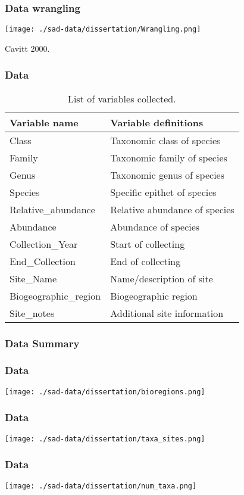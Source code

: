 \documentclass[14pt]{beamer}
\begin{document}
\begin{frame}[t]
\frametitle{Data wrangling}
\begin{center}
\texttt{[image: ./sad-data/dissertation/Wrangling.png]}
\end{center}
\begin{tiny}
Cavitt 2000.
\end{tiny}
\end{frame}

\begin{frame}[shrink=30]
\frametitle{Data}
\begin{table}
\begin{tabular}{l|l} 
 Variable name & Variable definitions\\ 
\hline
 Class & Taxonomic class of species \\
 Family & Taxonomic family of species \\
 Genus & Taxonomic genus of species\\
 Species & Specific epithet of species  \\
 Relative\_abundance & Relative abundance of species \\
 Abundance & Abundance of species \\
 Collection\_Year & Start of collecting \\
 End\_Collection & End of collecting \\
 Site\_Name & Name/description of site \\
 Biogeographic\_region & Biogeographic region \\
 Site\_notes & Additional site information \\ 
\end{tabular}
\caption{List of variables collected.}
\end{table}
\end{frame}

\subsubsection{Data Summary}
\begin{frame}{}
\frametitle{Data}
\texttt{[image: ./sad-data/dissertation/bioregions.png]}
\end{frame}

\begin{frame}{}
\frametitle{Data}
\texttt{[image: ./sad-data/dissertation/taxa\_sites.png]}
\end{frame}

\begin{frame}{}
\frametitle{Data}
\texttt{[image: ./sad-data/dissertation/num\_taxa.png]}
\end{frame}
\end{document}
